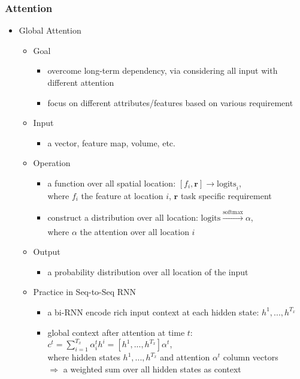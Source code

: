\subsubsection{Attention}
\begin{itemize}
\item Global Attention
	\begin{itemize}
	\item Goal
		\begin{itemize}
		\item overcome long-term dependency, via considering all input with different attention
		\item focus on different attributes/features based on various requirement
		\end{itemize}
	\item Input
		\begin{itemize}
		\item a vector, feature map, volume, etc.
		\end{itemize}
	\item Operation
		\begin{itemize}
		\item a function over all spatial location: $[f_i, \mathbf r]\rightarrow \text{logits}_i$, \\ 
		where $f_i$ the feature at location $i$, $\mathbf r$ task specific requirement
		\item construct a distribution over all location: $\text{logits} \xrightarrow[]{\text{softmax}} \alpha$, \\
		where $\alpha$ the attention over all location $i$
		\end{itemize}
	\item Output
		\begin{itemize}
		\item a probability distribution over all location of the input
		\end{itemize}
	\item Practice in Seq-to-Seq RNN
		\begin{itemize}
		\item a bi-RNN encode rich input context at each hidden state: $h^1,...,h^{T_x}$
		\item global context after attention at time $t$: $\displaystyle c^t=\sum_{i=1}^{T_x}\alpha^t_i h^i = [h^1,...,h^{T_x}]\alpha^t$, \\
		where hidden states $h^1,...,h^{T_x}$ and attention $\alpha^t$ column vectors \\
		$\Rightarrow$ a weighted sum over all hidden states as context

\end{itemize}
\end{itemize}
\end{itemize}
